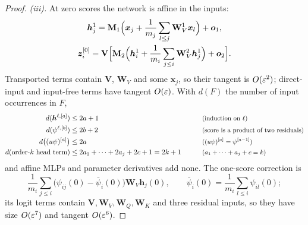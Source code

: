 \begin{proof}
\emph{(iii).} At zero scores the network is affine in the inputs:
\begin{gather*}
 \bm h^1_j=\mathbf M_1\Bigl(\bm x_j+\frac{1}{m_j}\sum_{l\le j}\mathbf W^1_V\bm x_l\Bigr)+\bm o_1,\\
 \bm z^{[0]}_i=\mathbf V\Bigl[\mathbf M_2\Bigl(\bm h^1_i+\frac{1}{m_i}\sum_{j\le i}\mathbf W^2_V\bm h^1_j\Bigr)+\bm o_2\Bigr].
\end{gather*}
Transported terms contain $\mathbf V$, $\mathbf W_V$ and some $\bm x_j$, so their tangent is $O(\varepsilon^2)$; direct-input and input-free terms have tangent $O(\varepsilon)$.
With $d(F)$ the number of input occurrences in $F$,
\begin{alignat*}{2}
 d(\bm h^{\ell,[a]})&\le2a+1 &\qquad& \text{\small(induction on $\ell$)}\\
 d(\psi^{\ell,[b]})&\le2b+2 && \text{\small(score is a product of two residuals)}\\
 d\bigl((u\psi)^{[a]}\bigr)&\le2a && \text{\small($(u\psi)^{[a]}=\psi^{[a-1]}$)}\\
 d(\text{order-$k$ head term})&\le2a_1+\cdots+2a_j+2c+1=2k+1 && \text{\small($a_1+\cdots+a_j+c=k$)}
\end{alignat*}
and affine MLPs and parameter derivatives add none. The one-score correction is
\[
 \frac{1}{m_i}\sum_{j\le i}\bigl(\psi_{ij}(0)-\bar\psi_i(0)\bigr)\mathbf W_V\bm h_j(0),\qquad \bar\psi_i(0)=\frac{1}{m_i}\sum_{l\le i}\psi_{il}(0);
\]
its logit terms contain $\mathbf V,\mathbf W_V,\mathbf W_Q,\mathbf W_K$ and three residual inputs, so they have size $O(\varepsilon^7)$ and tangent $O(\varepsilon^6)$.


\end{proof}
